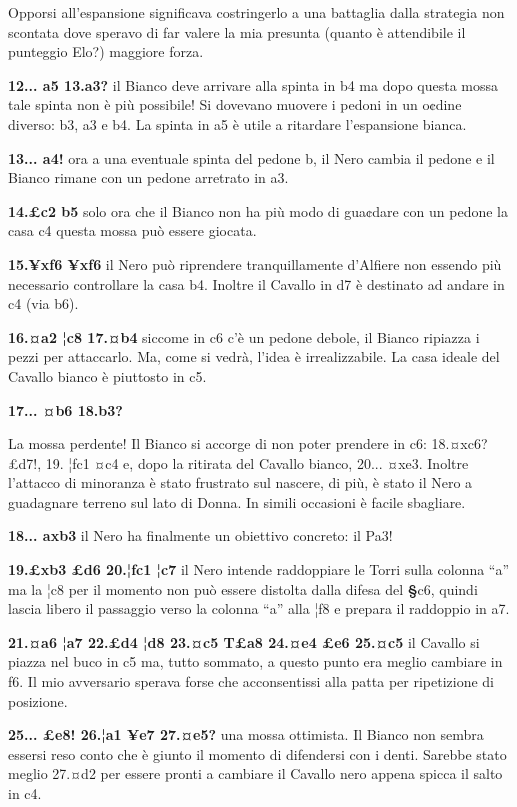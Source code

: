 Opporsi all'espansione significava costringerlo a una battaglia dalla
strategia non scontata dove speravo di far valere la mia presunta
(quanto è attendibile il punteggio Elo?) maggiore forza.

\textbf{12... a5 13.a3?} il Bianco deve arrivare alla spinta in b4 ma
dopo questa mossa tale spinta non è più possibile! Si dovevano muovere i
pedoni in un o¢dine diverso: b3, a3 e b4. La spinta in a5 è utile a
ritardare l'espansione bianca.

\textbf{13... a4!} ora a una eventuale spinta del pedone b, il Nero
cambia il pedone e il Bianco rimane con un pedone arretrato in a3.

\textbf{14.£c2 b5} solo ora che il Bianco non ha più modo di gua¢dare
con un pedone la casa c4 questa mossa può essere giocata.

\textbf{15.¥xf6 ¥xf6} il Nero può riprendere tranquillamente d'Alfiere
non essendo più necessario controllare la casa b4. Inoltre il Cavallo in
d7 è destinato ad andare in c4 (via b6).

\textbf{16.¤a2 ¦c8 17.¤b4} siccome in c6 c'è un pedone debole, il Bianco
ripiazza i pezzi per attaccarlo. Ma, come si vedrà, l'idea è
irrealizzabile. La casa ideale del Cavallo bianco è piuttosto in c5.

\textbf{17... ¤b6 18.b3?}


La mossa perdente! Il Bianco si accorge di non poter prendere in c6:
18.¤xc6? £d7!, 19. ¦fc1 ¤c4 e, dopo la ritirata del Cavallo bianco,
20... ¤xe3. Inoltre l'attacco di minoranza è stato frustrato sul
nascere, di più, è stato il Nero a guadagnare terreno sul lato di Donna.
In simili occasioni è facile sbagliare.

\textbf{18... axb3} il Nero ha finalmente un obiettivo concreto: il Pa3!

\textbf{19.£xb3 £d6 20.¦fc1 ¦c7} il Nero intende raddoppiare le Torri
sulla colonna ``a'' ma la ¦c8 per il momento non può essere distolta
dalla difesa del \textbf{§}c6, quindi lascia libero il passaggio verso
la colonna ``a'' alla ¦f8 e prepara il raddoppio in a7.

\textbf{21.¤a6 ¦a7 22.£d4 ¦d8 23.¤c5 T£a8 24.¤e4 £e6 25.¤c5} il Cavallo
si piazza nel buco in c5 ma, tutto sommato, a questo punto era meglio
cambiare in f6. Il mio avversario sperava forse che acconsentissi alla
patta per ripetizione di posizione.

\textbf{25... £e8! 26.¦a1 ¥e7 27.¤e5?} una mossa ottimista. Il Bianco
non sembra essersi reso conto che è giunto il momento di difendersi con
i denti. Sarebbe stato meglio 27.¤d2 per essere pronti a cambiare il
Cavallo nero appena spicca il salto in c4.

